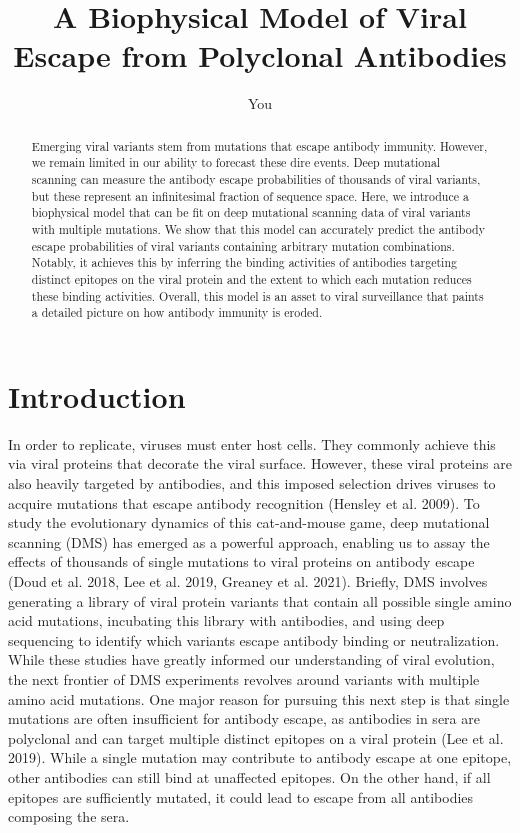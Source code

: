 \documentclass{article}
\title{A Biophysical Model of Viral Escape from Polyclonal Antibodies}
\author{You}
\begin{document}
\maketitle

\begin{abstract}
Emerging viral variants stem from mutations that escape antibody immunity.
However, we remain limited in our ability to forecast these dire events.
Deep mutational scanning can measure the antibody escape probabilities of thousands of viral variants, but these represent an infinitesimal fraction of sequence space.
Here, we introduce a biophysical model that can be fit on deep mutational scanning data of viral variants with multiple mutations.
We show that this model can accurately predict the antibody escape probabilities of viral variants containing arbitrary mutation combinations.
Notably, it achieves this by inferring the binding activities of antibodies targeting distinct epitopes on the viral protein and the extent to which each mutation reduces these binding activities.
Overall, this model is an asset to viral surveillance that paints a detailed picture on how antibody immunity is eroded.
\end{abstract}

\section*{Introduction}

In order to replicate, viruses must enter host cells.
They commonly achieve this via viral proteins that decorate the viral surface.
However, these viral proteins are also heavily targeted by antibodies, and this imposed selection drives viruses to acquire mutations that escape antibody recognition (Hensley et al. 2009).
To study the evolutionary dynamics of this cat-and-mouse game, deep mutational scanning (DMS) has emerged as a powerful approach, enabling us to assay the effects of thousands of single mutations to viral proteins on antibody escape (Doud et al. 2018, Lee et al. 2019, Greaney et al. 2021).
Briefly, DMS involves generating a library of viral protein variants that contain all possible single amino acid mutations, incubating this library with antibodies, and using deep sequencing to identify which variants escape antibody binding or neutralization.
While these studies have greatly informed our understanding of viral evolution, the next frontier of DMS experiments revolves around variants with multiple amino acid mutations.
One major reason for pursuing this next step is that single mutations are often insufficient for antibody escape, as antibodies in sera are polyclonal and can target multiple distinct epitopes on a viral protein (Lee et al. 2019).
While a single mutation may contribute to antibody escape at one epitope, other antibodies can still bind at unaffected epitopes.
On the other hand, if all epitopes are sufficiently mutated, it could lead to escape from all antibodies composing the sera.
\end{document}
